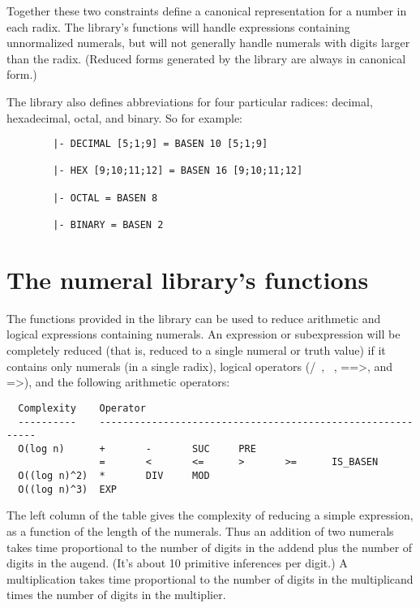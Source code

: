 Together these two constraints define a canonical representation for a number
in each radix.  The library's functions will handle expressions containing
unnormalized numerals, but will not generally handle numerals with digits
larger than the radix.  (Reduced forms generated by the library are always in
canonical form.)

The library also defines abbreviations for four particular radices: decimal,
hexadecimal, octal, and binary.  So for example:

\begin{hol}\begin{verbatim}
        |- DECIMAL [5;1;9] = BASEN 10 [5;1;9]

        |- HEX [9;10;11;12] = BASEN 16 [9;10;11;12]

        |- OCTAL = BASEN 8

        |- BINARY = BASEN 2
\end{verbatim}\end{hol}

\section{The numeral library's functions}

The functions provided in the library can be used to reduce arithmetic and
logical expressions containing numerals. An expression or subexpression will
be completely reduced (that is, reduced to a single numeral or truth value)
if it contains only numerals (in a single radix), logical operators (/\, \/, ~,
==>, and =>), and the following arithmetic operators:

\begin{hol}\begin{verbatim}
  Complexity    Operator
  ----------    -----------------------------------------------------------
  O(log n)      +       -       SUC     PRE
                =       <       <=      >       >=      IS_BASEN
  O((log n)^2)  *       DIV     MOD
  O((log n)^3)  EXP
\end{verbatim}\end{hol}

The left column of the table gives the complexity of reducing a simple
expression, as a function of the length of the numerals.  Thus an addition of
two numerals takes time proportional to the number of digits in the addend
plus the number of digits in the augend.  (It's about 10 primitive inferences
per digit.)  A multiplication takes time proportional to the number of digits
in the multiplicand times the number of digits in the multiplier.


